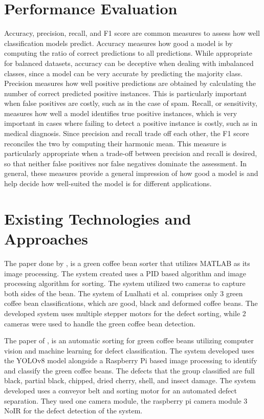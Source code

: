 \section{Performance Evaluation}

Accuracy, precision, recall, and F1 score are common measures to assess how well classification models predict. Accuracy measures how good a model is by computing the ratio of correct predictions to all predictions. While appropriate for balanced datasets, accuracy can be deceptive when dealing with imbalanced classes, since a model can be very accurate by predicting the majority class. Precision measures how well positive predictions are obtained by calculating the number of correct predicted positive instances. This is particularly important  when false positives are costly, such as in the case of spam. Recall, or sensitivity, measures how well a model identifies true positive instances, which is very important in cases where failing to detect a positive instance is costly, such as in medical diagnosis. Since precision and recall trade off each other, the F1 score reconciles the two by computing their harmonic mean. This measure is particularly appropriate when a trade-off between precision and recall is desired, so that neither false positives nor false negatives dominate the assessment. In general, these measures provide a general impression of how good a model is and help decide how well-suited the model is for different applications.

\section{Existing Technologies and Approaches}
The paper done by \cite{Lualhati_Mariano_Torres_Fenol_2022}, is a green coffee bean sorter that utilizes MATLAB as its image processing. The system created uses a PID based algorithm and image processing algorithm for sorting. The system utilized two cameras to capture both sides of the bean. The system of Lualhati et al. comprises only 3 green coffee bean classifications, which are good, black and deformed coffee beans. The developed system uses multiple stepper motors for the defect sorting, while 2 cameras were used to handle the green coffee bean detection. 

The paper of \cite{Balay_Cabrera_Jensen_Mayuga_2024}, is an automatic sorting for green coffee beans utilizing computer vision and machine learning for defect classification. The system developed uses the YOLOv8 model alongside a Raspberry Pi based image processing to identify and classify the green coffee beans. The defects that the group classified are full black, partial black, chipped, dried cherry, shell, and insect damage. The system developed uses a conveyor belt and sorting motor for an automated defect separation. They used one camera module, the raspberry pi camera module 3 NoIR for the defect detection of the system. 

